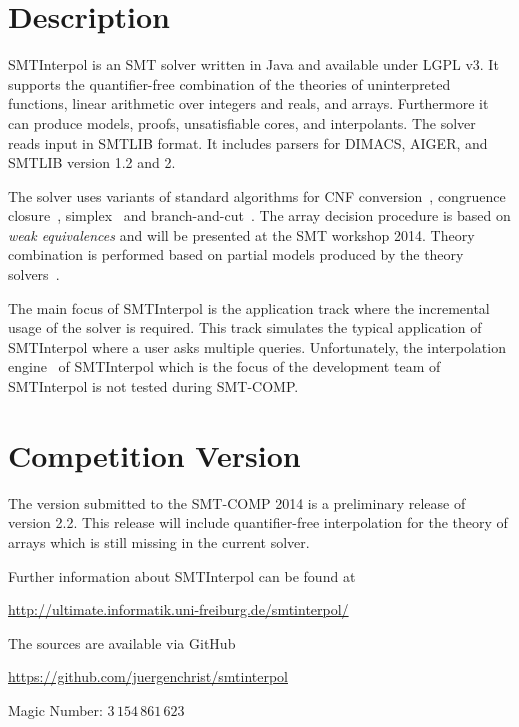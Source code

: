 \documentclass{article}
\title{\SI\\{\large Version \version}}
\author{J\"urgen Christ, Jochen Hoenicke\\
  University of Freiburg\\
  \texttt{\{christj,hoenicke\}@informatik.uni-freiburg.de}}
\date{May 26, 2014}
\newcommand\SI{SMTInterpol\xspace}
\begin{document}
\maketitle
\section*{Description}
\SI is an SMT solver written in Java and available under LGPL v3.  It supports
the quantifier-free combination of the theories of uninterpreted functions,
linear arithmetic over integers and reals, and arrays.  Furthermore it can
produce models, proofs, unsatisfiable cores, and interpolants.  The solver
reads input in SMTLIB format.  It includes parsers for DIMACS, AIGER, and
SMTLIB version 1.2 and 2.

The solver uses variants of standard algorithms for CNF
conversion~\cite{DBLP:journals/jsc/PlaistedG86}, congruence
closure~\cite{DBLP:conf/rta/NieuwenhuisO05}, simplex~\cite{DBLP:conf/cav/DutertreM06} and
branch-and-cut~\cite{DBLP:conf/cav/DilligDA09}.
The array decision procedure is based on \emph{weak equivalences} and will be
presented at the SMT workshop 2014.
Theory combination is performed based on partial models produced by the theory
solvers~\cite{DBLP:journals/entcs/MouraB08}.

The main focus of \SI is the application track where the incremental usage of
the solver is required.  This track simulates the typical application of \SI
where a user asks multiple queries.  Unfortunately, the interpolation
engine~\cite{DBLP:conf/tacas/ChristHN13} of \SI which is the focus of the
development team of \SI is not tested during SMT-COMP.

\section*{Competition Version}
The version submitted to the SMT-COMP 2014 is a preliminary release of version
2.2.  This release will include quantifier-free interpolation for the theory
of arrays which is still missing in the current solver.

Further information about \SI can be found at
\begin{center}
  \url{http://ultimate.informatik.uni-freiburg.de/smtinterpol/}
\end{center}
The sources are available via GitHub
\begin{center}
  \url{https://github.com/juergenchrist/smtinterpol}
\end{center}

Magic Number: $3\,154\,861\,623$



\end{document}
